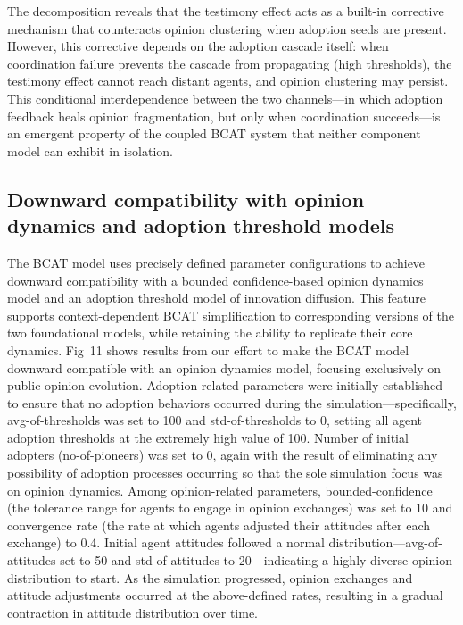 \documentclass[10pt,letterpaper]{article}
\begin{document}
The decomposition reveals that the testimony effect acts as a built-in corrective mechanism that counteracts opinion clustering when adoption seeds are present. However, this corrective depends on the adoption cascade itself: when coordination failure prevents the cascade from propagating (high thresholds), the testimony effect cannot reach distant agents, and opinion clustering may persist. This conditional interdependence between the two channels---in which adoption feedback heals opinion fragmentation, but only when coordination succeeds---is an emergent property of the coupled BCAT system that neither component model can exhibit in isolation.


\subsection*{Downward compatibility with opinion dynamics and adoption threshold models}

The BCAT model uses precisely defined parameter configurations to achieve downward compatibility with a bounded confidence-based opinion dynamics model and an adoption threshold model of innovation diffusion. This feature supports context-dependent BCAT simplification to corresponding versions of the two foundational models, while retaining the ability to replicate their core dynamics. Fig~11 shows results from our effort to make the BCAT model downward compatible with an opinion dynamics model, focusing exclusively on public opinion evolution. Adoption-related parameters were initially established to ensure that no adoption behaviors occurred during the simulation---specifically, avg-of-thresholds was set to 100 and std-of-thresholds to 0, setting all agent adoption thresholds at the extremely high value of 100. Number of initial adopters (no-of-pioneers) was set to 0, again with the result of eliminating any possibility of adoption processes occurring so that the sole simulation focus was on opinion dynamics. Among opinion-related parameters, bounded-confidence (the tolerance range for agents to engage in opinion exchanges) was set to 10 and convergence rate (the rate at which agents adjusted their attitudes after each exchange) to 0.4. Initial agent attitudes followed a normal distribution---avg-of-attitudes set to 50 and std-of-attitudes to 20---indicating a highly diverse opinion distribution to start. As the simulation progressed, opinion exchanges and attitude adjustments occurred at the above-defined rates, resulting in a gradual contraction in attitude distribution over time.
\end{document}
